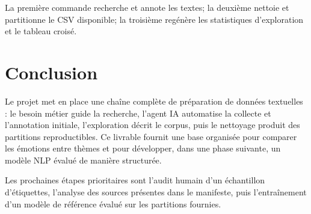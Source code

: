 \documentclass[11pt,a4paper]{article}
\begin{document}
La première commande recherche et annote les textes; la deuxième nettoie et partitionne le CSV disponible; la troisième regénère les statistiques d'exploration et le tableau croisé.

\section*{Conclusion}
Le projet met en place une chaîne complète de préparation de données textuelles : le besoin métier guide la recherche, l'agent IA automatise la collecte et l'annotation initiale, l'exploration décrit le corpus, puis le nettoyage produit des partitions reproductibles. Ce livrable fournit une base organisée pour comparer les émotions entre thèmes et pour développer, dans une phase suivante, un modèle NLP évalué de manière structurée.

Les prochaines étapes prioritaires sont l'audit humain d'un échantillon d'étiquettes, l'analyse des sources présentes dans le manifeste, puis l'entraînement d'un modèle de référence évalué sur les partitions fournies.

\end{document}
